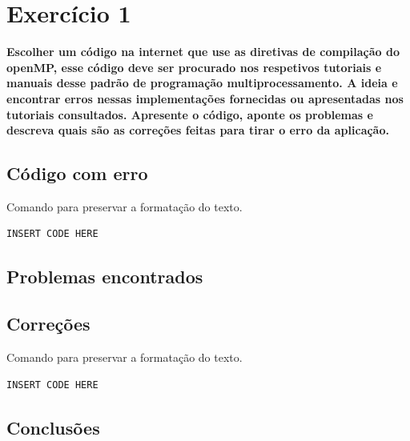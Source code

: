 \documentclass[12pt,fleqn]{article}
\begin{document}
\section{Exercício 1} 
\textbf{Escolher um código na internet que use as diretivas de compilação do openMP, esse código deve ser procurado nos respetivos tutoriais e manuais desse padrão de programação multiprocessamento. A ideia e encontrar erros nessas implementações fornecidas ou apresentadas nos tutoriais consultados. Apresente o código, aponte os problemas e descreva quais são as correções feitas para tirar o erro da aplicação.} 
 
\subsection{Código com erro} 
Comando para preservar a formatação do texto. 
\begin{verbatim} 
INSERT CODE HERE 
\end{verbatim} 
 
\subsection{Problemas encontrados} 
 
\subsection{Correções} 
Comando para preservar a formatação do texto. 
\begin{verbatim} 
INSERT CODE HERE 
\end{verbatim} 
 
\subsection{Conclusões} 
 
\clearpage 
\end{document}
